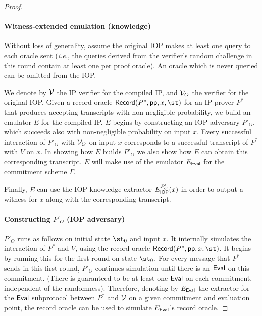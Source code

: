 \begin{proof}
\paragraph{Witness-extended emulation (knowledge)}
Without loss of generality, assume the original IOP makes at least one query to each oracle sent (\emph{i.e.}, the queries derived from the verifier's random challenge in this round contain at least one per proof oracle). An oracle which is never queried can be omitted from the IOP.

We denote by $\mathcal{V}$ the IP verifier for the compiled IP, and $\mathcal{V}_{O}$ the verifier for the original IOP. 
Given a record oracle $\pro{Record}(P^*, \params, x, \st)$ for an IP prover $P^*$ that produces accepting transcripts with non-negligible probability, we build an emulator $E$ for the compiled IP. $E$ begins by constructing an IOP adversary $P'_{O}$, which succeeds also with non-negligible probability on input $x$. Every successful interaction of $P'_{O}$ with $\mathcal{V}_{O}$ on input $x$ corresponds to a successful transcript of $P^*$ with $V$ on $x$. In showing how $E$ builds $P'_{O}$ we also show how $E$ can obtain this corresponding transcript. $E$ will make use of the emulator $E_\textsf{{Eval}}$ for the commitment scheme $\Gamma$. %

Finally, $E$ can use the IOP knowledge extractor $E_{\textsf{{IOP}}}^{P'_O}(x)$ in order to output a witness for $x$ along with the corresponding transcript. 

\paragraph{Constructing $P'_O$ (IOP adversary)}
$P'_O$ runs as follows on initial state $\st_0$ and input $x$. It internally simulates the interaction of $P^*$ and $V$, using the record oracle $\pro{Record}(P^*, \params, x, \st)$. It begins by running this for the first round on state $\st_0$. For every message that $P^*$ sends in this first round, $P'_O$ continues simulation until there is an $\textsf{{Eval}}$ on this commitment. (There is guaranteed to be at least one $\textsf{{Eval}}$ on each commitment, independent of the randomness). Therefore, denoting by $E_\textsf{{Eval}}$ the extractor for the $\textsf{{Eval}}$ subprotocol between $P^*$ and $\mathcal{V}$ on a given commitment and evaluation point, the record oracle can be used to simulate $E_\textsf{{Eval}}$'s record oracle.%


\end{proof}
